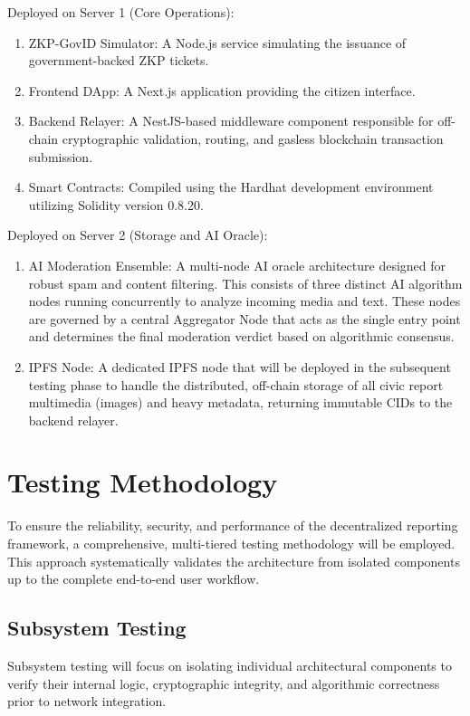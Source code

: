 Deployed on Server 1 (Core Operations):
\begin{enumerate}
    \item ZKP-GovID Simulator: A Node.js service simulating the issuance of government-backed \ac{ZKP} tickets.
    \item Frontend DApp: A Next.js application providing the citizen interface.
    \item Backend Relayer: A NestJS-based middleware component responsible for off-chain cryptographic validation, routing, and gasless blockchain transaction submission.
    \item Smart Contracts: Compiled using the Hardhat development environment utilizing Solidity version 0.8.20.
\end{enumerate}

Deployed on Server 2 (Storage and AI Oracle):
\begin{enumerate}
    \item AI Moderation Ensemble: A multi-node AI oracle architecture designed for robust spam and content filtering. This consists of three distinct AI algorithm nodes running concurrently to analyze incoming media and text. These nodes are governed by a central Aggregator Node that acts as the single entry point and determines the final moderation verdict based on algorithmic consensus.
    \item IPFS Node: A dedicated \ac{IPFS} node that will be deployed in the subsequent testing phase to handle the distributed, off-chain storage of all civic report multimedia (images) and heavy metadata, returning immutable \ac{CID}s to the backend relayer.
\end{enumerate}

\section{Testing Methodology}
\label{subsec:testing-methodology}

To ensure the reliability, security, and performance of the decentralized reporting framework, a comprehensive, multi-tiered testing methodology will be employed. This approach systematically validates the architecture from isolated components up to the complete end-to-end user workflow.

\subsection{Subsystem Testing}
Subsystem testing will focus on isolating individual architectural components to verify their internal logic, cryptographic integrity, and algorithmic correctness prior to network integration.

